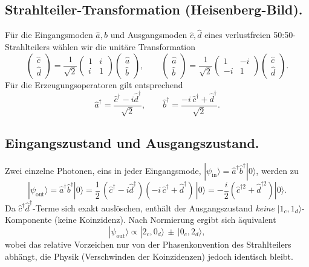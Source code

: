 \subsection*{Strahlteiler-Transformation (Heisenberg-Bild).}
Für die Eingangsmoden \(\hat a,\hat b\) und Ausgangsmoden \(\hat c,\hat d\) eines verlustfreien 50:50-Strahlteilers wählen wir die unitäre Transformation
\[
\begin{pmatrix}
	\hat c \\ \hat d
\end{pmatrix}
= \frac{1}{\sqrt{2}}
\begin{pmatrix}
	1 & i \\
	i & 1
\end{pmatrix}
\begin{pmatrix}
	\hat a \\ \hat b
\end{pmatrix},
\qquad
\begin{pmatrix}
	\hat a \\ \hat b
\end{pmatrix}
= \frac{1}{\sqrt{2}}
\begin{pmatrix}
	1 & -i \\
	-i & 1
\end{pmatrix}
\begin{pmatrix}
	\hat c \\ \hat d
\end{pmatrix}.
\]
Für die Erzeugungsoperatoren gilt entsprechend
\[
\hat a^\dagger=\frac{\hat c^\dagger - i \hat d^\dagger}{\sqrt{2}},
\qquad
\hat b^\dagger=\frac{-i\,\hat c^\dagger + \hat d^\dagger}{\sqrt{2}}.
\]

\subsection*{Eingangszustand und Ausgangszustand.}
Zwei einzelne Photonen, eins in jeder Eingangs­mode,
\(|\psi_{\text{in}}\rangle=\hat a^\dagger \hat b^\dagger |0\rangle\),
werden zu
\[
|\psi_{\text{out}}\rangle
= \hat a^\dagger \hat b^\dagger |0\rangle
= \frac{1}{2}\,(\hat c^\dagger - i \hat d^\dagger)(-i\,\hat c^\dagger + \hat d^\dagger)\,|0\rangle
= -\frac{i}{2}\!\left(\hat c^{\dagger 2}+\hat d^{\dagger 2}\right)|0\rangle.
\]
Da \(\hat c^\dagger \hat d^\dagger\)-Terme sich exakt auslöschen, enthält der Ausgangszustand \emph{keine} \(|1_c,1_d\rangle\)-Komponente (keine Koinzidenz). Nach Normierung ergibt sich äquivalent
\[
|\psi_{\text{out}}\rangle
\propto |2_c,0_d\rangle \,\pm\, |0_c,2_d\rangle,
\]
wobei das relative Vorzeichen nur von der Phasenkonvention des Strahlteilers abhängt, die Physik (Verschwinden der Koinzidenzen) jedoch identisch bleibt.

